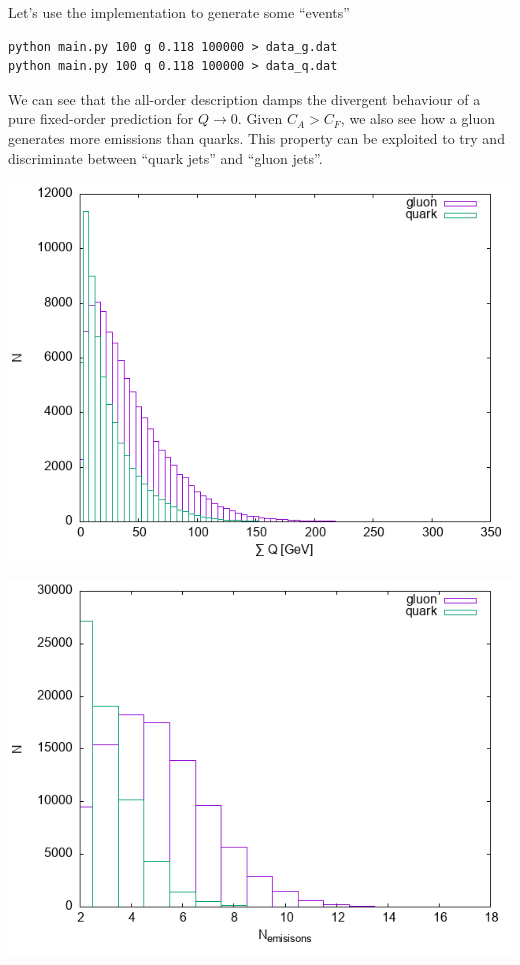 \documentclass[11pt]{article}
\begin{document}
Let's use the implementation to generate some ``events''
\begin{verbatim}
python main.py 100 g 0.118 100000 > data_g.dat
python main.py 100 q 0.118 100000 > data_q.dat
\end{verbatim}

We can see that the all-order description damps the divergent behaviour of a pure fixed-order prediction for \(Q\to0\).
Given \(C_A > C_F\), we also see how a gluon generates more emissions than quarks.
This property can be exploited to try and discriminate between ``quark jets'' and ``gluon jets''.
\begin{center}
\includegraphics[width=.9\linewidth]{data_Q.png}
\end{center}


\begin{center}
\includegraphics[width=.9\linewidth]{data_N.png}
\end{center}
\end{document}
